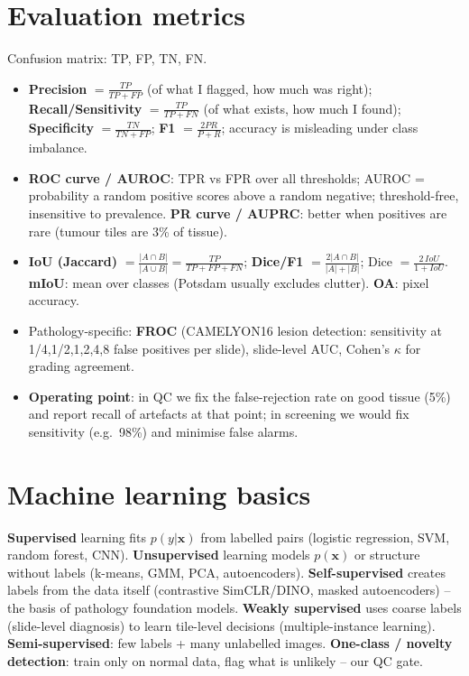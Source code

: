 \section{Evaluation metrics}
Confusion matrix: TP, FP, TN, FN.
\begin{itemize}
\item \textbf{Precision} $=\frac{TP}{TP+FP}$ (of what I flagged, how much was right); \textbf{Recall/Sensitivity}
$=\frac{TP}{TP+FN}$ (of what exists, how much I found); \textbf{Specificity} $=\frac{TN}{TN+FP}$;
\textbf{F1} $=\frac{2PR}{P+R}$; accuracy is misleading under class imbalance.
\item \textbf{ROC curve / AUROC}: TPR vs FPR over all thresholds; AUROC = probability a random positive scores above a
random negative; threshold-free, insensitive to prevalence. \textbf{PR curve / AUPRC}: better when positives are rare
(tumour tiles are 3\% of tissue).
\item \textbf{IoU (Jaccard)} $=\frac{|A\cap B|}{|A\cup B|}=\frac{TP}{TP+FP+FN}$; \textbf{Dice/F1}
$=\frac{2|A\cap B|}{|A|+|B|}$; Dice $=\frac{2\,IoU}{1+IoU}$. \textbf{mIoU}: mean over classes (Potsdam usually excludes
clutter). \textbf{OA}: pixel accuracy.
\item Pathology-specific: \textbf{FROC} (CAMELYON16 lesion detection: sensitivity at 1/4,1/2,1,2,4,8 false positives per
slide), slide-level AUC, Cohen's $\kappa$ for grading agreement.
\item \textbf{Operating point}: in QC we fix the false-rejection rate on good tissue (5\%) and report recall of
artefacts at that point; in screening we would fix sensitivity (e.g.\ 98\%) and minimise false alarms.
\end{itemize}

\section{Machine learning basics}
\textbf{Supervised} learning fits $p(y|\mathbf{x})$ from labelled pairs (logistic regression, SVM, random forest, CNN).
\textbf{Unsupervised} learning models $p(\mathbf{x})$ or structure without labels (k-means, GMM, PCA, autoencoders).
\textbf{Self-supervised} creates labels from the data itself (contrastive SimCLR/DINO, masked autoencoders) -- the
basis of pathology foundation models. \textbf{Weakly supervised} uses coarse labels (slide-level diagnosis) to learn
tile-level decisions (multiple-instance learning). \textbf{Semi-supervised}: few labels + many unlabelled images.
\textbf{One-class / novelty detection}: train only on normal data, flag what is unlikely -- our QC gate.

